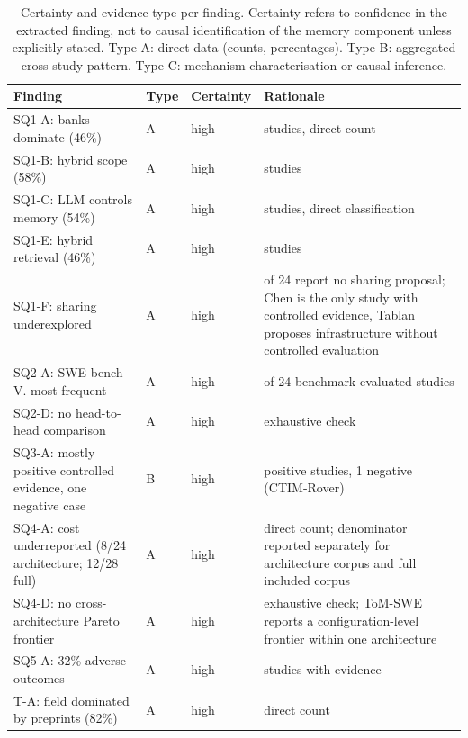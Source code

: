 \FloatBarrier

\begin{table}[htbp]
  \centering
  \caption{Certainty and evidence type per finding.
  Certainty refers to confidence in the extracted finding, not to causal
  identification of the memory component unless explicitly stated.
  Type A: direct data (counts, percentages).
  Type B: aggregated cross-study pattern.
  Type C: mechanism characterisation or causal inference.}
  \label{tab:certainty}
  \small
  \setlength{\tabcolsep}{7pt}
  \begin{tabularx}{\textwidth}{@{} >{\raggedright\arraybackslash}p{5.4cm} >{\centering\arraybackslash}p{0.7cm} >{\centering\arraybackslash}p{1.5cm} >{\raggedright\arraybackslash}X @{}}
    \toprule
    Finding & Type & Certainty & Rationale \\
    \midrule
    SQ1-A: banks dominate (46\%) & A & high & 11 studies, direct count \\
    SQ1-B: hybrid scope (58\%) & A & high & 14 studies \\
    SQ1-C: LLM controls memory (54\%) & A & high & 13 studies, direct
      classification \\
    SQ1-E: hybrid retrieval (46\%) & A & high & 11 studies \\
    SQ1-F: sharing underexplored & A & high &
      22 of 24 report no sharing proposal; Chen is the only study with
      controlled evidence, Tablan proposes infrastructure without
      controlled evaluation \\
    SQ2-A: SWE-bench V. most frequent & A & high & 13 of 24 benchmark-evaluated studies \\
    SQ2-D: no head-to-head comparison & A & high & exhaustive check \\
    SQ3-A: mostly positive controlled evidence, one negative case & B & high &
      18 positive studies, 1 negative (CTIM-Rover) \\
    SQ4-A: cost underreported (8/24 architecture; 12/28 full) & A & high &
      direct count; denominator reported separately for architecture corpus
      and full included corpus \\
    SQ4-D: no cross-architecture Pareto frontier & A & high &
      exhaustive check; ToM-SWE reports a configuration-level frontier
      within one architecture \\
    SQ5-A: 32\% adverse outcomes & A & high & 9 studies with evidence \\
    T-A: field dominated by preprints (82\%) & A & high & direct count \\

\end{tabularx}
\end{table}
